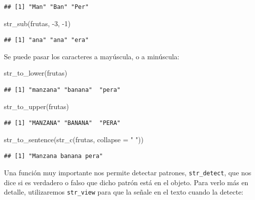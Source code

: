 \documentclass[
]{book}
\newenvironment{Shaded}{\begin{snugshade}}{\end{snugshade}}
\newcommand{\AttributeTok}[1]{\textcolor[rgb]{0.77,0.63,0.00}{#1}}
\newcommand{\DecValTok}[1]{\textcolor[rgb]{0.00,0.00,0.81}{#1}}
\newcommand{\FunctionTok}[1]{\textcolor[rgb]{0.00,0.00,0.00}{#1}}
\newcommand{\NormalTok}[1]{#1}
\newcommand{\SpecialCharTok}[1]{\textcolor[rgb]{0.00,0.00,0.00}{#1}}
\newcommand{\StringTok}[1]{\textcolor[rgb]{0.31,0.60,0.02}{#1}}
\begin{document}
\begin{verbatim}
## [1] "Man" "Ban" "Per"
\end{verbatim}

\begin{Shaded}
\begin{Highlighting}[]
\FunctionTok{str\_sub}\NormalTok{(frutas, }\SpecialCharTok{{-}}\DecValTok{3}\NormalTok{, }\SpecialCharTok{{-}}\DecValTok{1}\NormalTok{)}
\end{Highlighting}
\end{Shaded}

\begin{verbatim}
## [1] "ana" "ana" "era"
\end{verbatim}

Se puede pasar los caracteres a mayúscula, o a minúscula:

\begin{Shaded}
\begin{Highlighting}[]
\FunctionTok{str\_to\_lower}\NormalTok{(frutas)}
\end{Highlighting}
\end{Shaded}

\begin{verbatim}
## [1] "manzana" "banana"  "pera"
\end{verbatim}

\begin{Shaded}
\begin{Highlighting}[]
\FunctionTok{str\_to\_upper}\NormalTok{(frutas)}
\end{Highlighting}
\end{Shaded}

\begin{verbatim}
## [1] "MANZANA" "BANANA"  "PERA"
\end{verbatim}

\begin{Shaded}
\begin{Highlighting}[]
\FunctionTok{str\_to\_sentence}\NormalTok{(}\FunctionTok{str\_c}\NormalTok{(frutas, }\AttributeTok{collapse =} \StringTok{" "}\NormalTok{))}
\end{Highlighting}
\end{Shaded}

\begin{verbatim}
## [1] "Manzana banana pera"
\end{verbatim}

Una función muy importante nos permite detectar patrones, \texttt{str\_detect}, que nos dice si es verdadero o falso que dicho patrón está en el objeto. Para verlo más en detalle, utilizaremos \texttt{str\_view} para que la señale en el texto cuando la detecte:
\end{document}
